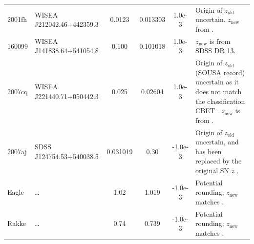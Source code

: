 \documentclass[
  journal=pasa,
  manuscript=research-paper,
  year=2022,
]{cup-journal}
\newcommand{\znew}{$z_{\text{new}}$}
\newcommand{\zold}{$z_{\text{old}}$}
\begin{document}
\begin{landscape}
\begin{ThreePartTable}
\begin{longtable}{llS[table-format=1.7]S[table-format=1.6]S[table-format=2.1e-3]p{11cm}}
2001fh & WISEA J212042.46+442359.3 & 0.0123 & 0.013303 & 1.0e-3 & Origin of \zold{} uncertain. \znew{} from \citet{vandenBosch2015}. \\
160099 & WISEA J141838.64+541054.8 & 0.100 & 0.101018 & 1.0e-3 & \znew{} is from SDSS DR 13.\\
2007cq & WISEA J221440.71+050442.3 & 0.025 & 0.02604 & 1.0e-3 & Origin of \zold{} (SOUSA record) uncertain as it does not match the classification CBET \citep{Filippenko2007}. \znew{} is from \citet{Childress2013}. \\
2007aj & SDSS J124754.53+540038.5 & 0.031019 & 0.30 & -1.0e-3 & Origin of \zold{} uncertain, and has been replaced by the original SN $z$ \citep{Quimby2007}. \\
Eagle & \dots & 1.02 & 1.019 & -1.0e-3 & Potential rounding; \znew{} matches \citet{Riess2007}.\\
Rakke & \dots & 0.74 & 0.739 & -1.0e-3 & Potential rounding; \znew{} matches \citet{Riess2007}.\\
\end{longtable}
\end{ThreePartTable}
\end{landscape}
\end{document}
